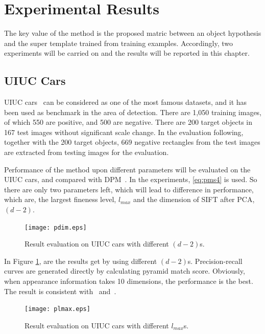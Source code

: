 \documentclass[paper]{ieice}
\begin{document}
\section{Experimental Results}
\label{exp5}
The key value of the method is the proposed matric between an object hypothesis and the super template trained from training examples. Accordingly, two experiments will be carried on and the results will be reported in this chapter.


\subsection{UIUC Cars}

UIUC cars~\cite{cds} can be considered as one of the most famous datasets, and it has been used as benchmark in the area of detection.
There are 1,050 training images, of which 550 are positive, and 500 are negative. There are 200 target objects in 167 test images without significant scale change. In the evaluation following, together with the 200 target objects, 669 negative rectangles from the test images are extracted from testing images for the evaluation.

Performance of the method upon different parameters will be evaluated on the UIUC cars, and compared with DPM~\cite{ac31}.
In the experiments, \ref{eq:pms4} is used. So there are only two parameters left, which will lead to difference in performance, which are, the largest fineness level, $l_{max}$ and the dimension of SIFT after PCA, $(d-2)$.






\begin{figure}[!htbp]
\centering

\texttt{[image: pdim.eps]}


\caption[Result evaluation using different dimensions]{Result evaluation on UIUC cars with different $(d-2)$s.}
\label{fig:c52}
\end{figure}


In Figure \ref{fig:c52}, are the results get by using different $(d-2)$s. Precision-recall curves are generated directly by calculating pyramid match score. Obviously, when appearance information takes 10 dimensions, the performance is the best. The result is consistent with~\cite{pmk} and~\cite{lwz}.


\begin{figure}[!htbp]
\centering

\texttt{[image: plmax.eps]}


\caption[Result evaluation using different largest fineness levels]{Result evaluation on UIUC cars with different $l_{max}$s.}
\label{fig:c53}
\end{figure}
\end{document}
